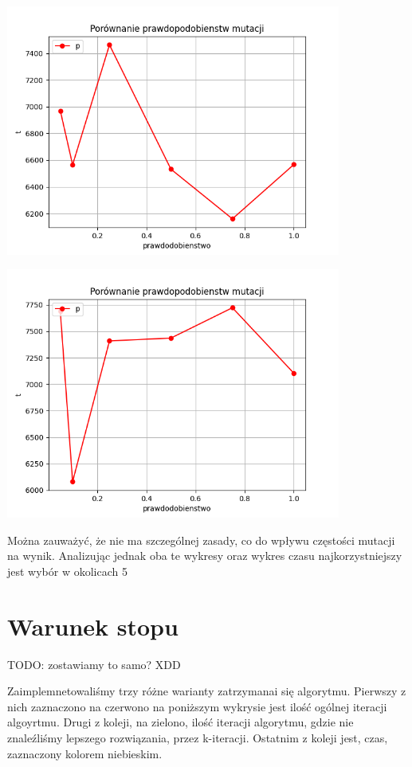 \documentclass{article}
\begin{document}
     \includegraphics[width=11cm]{../spr3img/Figure_6.png}

     \includegraphics[width=11cm]{../spr3img/Figure_62.png}

     Można zauważyć, że nie ma szczególnej zasady, co do wpływu częstości
     mutacji na wynik. Analizując jednak oba te wykresy oraz wykres czasu
     najkorzystniejszy jest wybór w okolicach 5%

    \section{Warunek stopu}

    TODO: zostawiamy to samo? XDD

    Zaimplemnetowaliśmy trzy różne warianty zatrzymanai się algorytmu.
    Pierwszy z nich zaznaczono na czerwono na poniższym wykrysie jest ilość ogólnej
    iteracji algoyrtmu. Drugi z koleji, na zielono, ilość iteracji algorytmu, gdzie
    nie znaleźliśmy lepszego rozwiązania, przez k-iteracji. Ostatnim z koleji jest, czas,
    zaznaczony kolorem niebieskim.
\end{document}
